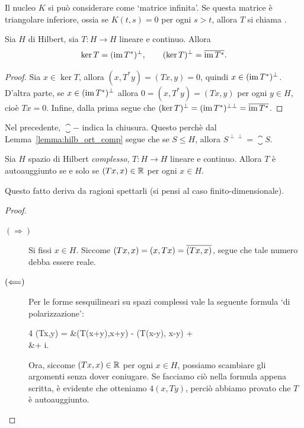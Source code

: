 \begin{remark}
	Il nucleo $K$ si può considerare come `matrice infinita'. Se questa matrice è triangolare inferiore, ossia se $K(t,s) = 0$ per ogni $s>t$, allora $T$ si chiama .
\end{remark}

\begin{lemma}
	Sia $H$ di Hilbert, sia $T : H \to H$ lineare e continuo.
	Allora
	\begin{equation*}
		\ker T = (\operatorname{im} T^*)^\perp, \qquad (\ker T)^\perp = \overline{\operatorname{im} T^*}.
	\end{equation*}
\end{lemma}
\begin{proof}
	Sia $x \in \ker T$, allora $(x, T^*y) = (Tx, y)=0$, quindi $x \in (\operatorname{im} T^*)^\perp$.
	D'altra parte, se $x \in (\operatorname{im} T^*)^\perp$ allora $0 = (x, T^*y) = (Tx,y)$ per ogni $y \in H$, cioè $Tx = 0$.
	Infine, dalla prima segue che $(\ker T)^\perp = (\operatorname{im} T^*)^{\perp\perp} = \overline{\operatorname{im} T^*}$.
\end{proof}

\begin{remark}
	Nel precedente, $\closure{-}$ indica la chiusura. Questo perchè dal Lemma~\ref{lemma:hilb_ort_comp} segue che se $S \leq H$, allora $S^{\perp\perp} = \closure{S}$.
\end{remark}

\begin{theorem}
	Sia $H$ spazio di Hilbert \emph{complesso}, $T:H \to H$ lineare e continuo.
	Allora $T$ è autoauggiunto se e solo se $(Tx, x) \in \mathbb{R}$ per ogni $x \in H$.
\end{theorem}
\begin{remark}
	Questo fatto deriva da ragioni spettarli (si pensi al caso finito-dimensionale).
\end{remark}
\begin{proof}
	\leavevmode
	\begin{description}
		\item[$(\Longrightarrow)$] Si fissi $x \in H$. Siccome $(Tx,x) = (x,Tx) = \overline{(Tx,x)}$, segue che tale numero debba essere reale.
		\item[$(\Longleftarrow)$] Per le forme sesquilineari su spazi complessi vale la seguente formula `di polarizzazione':
		\begin{eqalign*}
			4 (Tx,y) = &(T(x+y),x+y) - (T(x-y), x-y) +\\
				&\qquad + i\left[ (T(x+iy),x+iy) - (T(x-iy), x-iy) \right].
		\end{eqalign*}
		Ora, siccome $(Tx,x) \in \mathbb{R}$ per ogni $x \in H$, possiamo scambiare gli argomenti senza dover coniugare. Se facciamo ciò nella formula appena scritta, è evidente che otteniamo $4(x,Ty)$, perciò abbiamo provato che $T$ è autoauggiunto.
	\end{description}
\end{proof}

